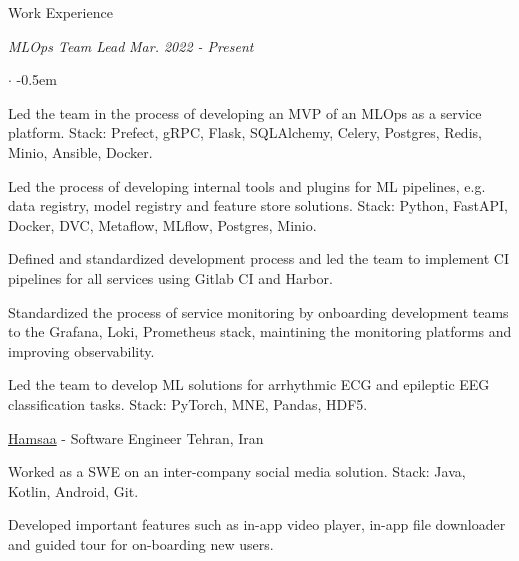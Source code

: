 \documentclass[../professional-cv.tex]{subfiles}
\begin{document}
\begin{rSection}{Work Experience}
\begin{rWorkSection}
		\vspace{-1em}
		{\em MLOps Team Lead} \hfill {\em Mar. 2022 - Present} \hspace{10pt}
		\normalfont
		\begin{list}{$\cdot$}{\leftmargin=10pt\normalfont \rightmargin=20pt}
			\itemsep -0.5em
			\item Led the team in the process of developing an MVP of an MLOps as a service platform. Stack: Prefect, gRPC, Flask, SQLAlchemy, Celery, Postgres, Redis, Minio, Ansible, Docker.
			\item Led the process of developing internal tools and plugins for ML pipelines, e.g. data registry, model registry and feature store solutions. Stack: Python, FastAPI, Docker, DVC, Metaflow, MLflow, Postgres, Minio.
			\item Defined and standardized development process and led the team to implement CI pipelines for all services using Gitlab CI and Harbor.
			\item Standardized the process of service monitoring by onboarding development teams to the Grafana, Loki, Prometheus stack, maintining the monitoring platforms and improving observability.
			\item Led the team to develop ML solutions for arrhythmic ECG and epileptic EEG classification tasks. Stack: PyTorch, MNE, Pandas, HDF5.
		\end{list}
	\end{rWorkSection}

	\begin{rSubsection}
		{\href{https://hamsaa.ir}{Hamsaa}}
		{  -  }
		{Software Engineer}
		{Tehran, Iran}
		\item Worked as a SWE on an inter-company social media solution. Stack: Java, Kotlin, Android, Git.
		\item Developed important features such as in-app video player, in-app file downloader and guided tour for on-boarding new users.

	\end{rSubsection}



\end{rSection}
\end{document}
